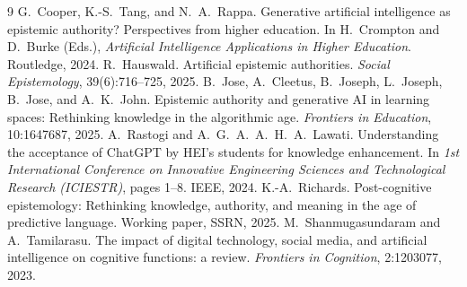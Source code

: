 \documentclass[11pt,a4paper]{article}
\begin{document}
\begin{thebibliography}{9}\small
{} G.~Cooper, K.-S.~Tang, and N.~A.~Rappa. Generative artificial intelligence as epistemic authority? Perspectives from higher education. In H.~Crompton and D.~Burke (Eds.), \emph{Artificial Intelligence Applications in Higher Education}. Routledge, 2024.
 R.~Hauswald. Artificial epistemic authorities. \emph{Social Epistemology}, 39(6):716--725, 2025.
 B.~Jose, A.~Cleetus, B.~Joseph, L.~Joseph, B.~Jose, and A.~K.~John. Epistemic authority and generative AI in learning spaces: Rethinking knowledge in the algorithmic age. \emph{Frontiers in Education}, 10:1647687, 2025.
 A.~Rastogi and A.~G.~A.~A.~H.~A.~Lawati. Understanding the acceptance of ChatGPT by HEI's students for knowledge enhancement. In \emph{1st International Conference on Innovative Engineering Sciences and Technological Research (ICIESTR)}, pages 1--8. IEEE, 2024.
 K.-A.~Richards. Post-cognitive epistemology: Rethinking knowledge, authority, and meaning in the age of predictive language. Working paper, SSRN, 2025.
 M.~Shanmugasundaram and A.~Tamilarasu. The impact of digital technology, social media, and artificial intelligence on cognitive functions: a review. \emph{Frontiers in Cognition}, 2:1203077, 2023.
\end{thebibliography}

\appendix
\end{document}
